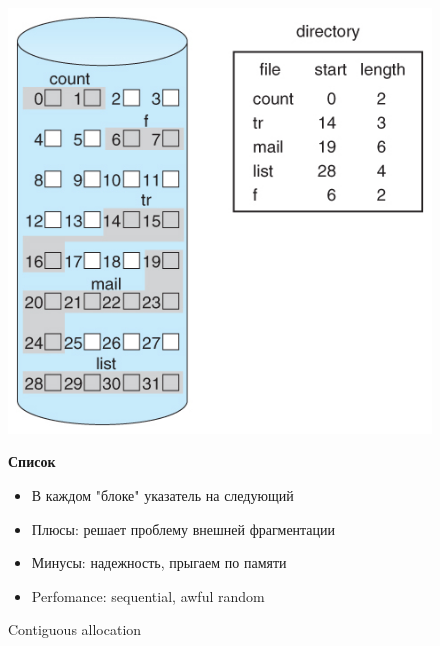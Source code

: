 \documentclass[../../lectures.tex]{subfiles}
\begin{document}
\begin{figure}[H]
\begin{minipage}[c]{0.47\linewidth}
\centering
\includegraphics[width=\textwidth]{images/contiguous-allocation.jpg}
\caption{Contiguous allocation}
\end{minipage}
\hspace{0.5cm}
\begin{minipage}[c]{0.5\linewidth}
\centering
\textbf{Список}
\begin{itemize}
    \item В каждом "блоке" указатель на следующий
    \item Плюсы: решает проблему внешней фрагментации
    \item Минусы: надежность, прыгаем по памяти
    \item Perfomance: sequential, awful random
\end{itemize}
\end{minipage}
\end{figure}
\end{document}
